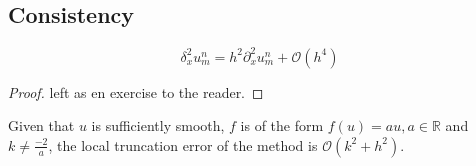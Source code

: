 \subsection{Consistency}

\begin{lemma}
    \label{central_difference}
    $$\delta_x^2u_{m}^{n} = h^2\partial_x^2 u_{m}^{n} + \mathcal{O}(h^4)$$
\end{lemma}
\begin{proof}
    left as en exercise to the reader.
\end{proof}

\begin{theorem}
    \label{consistent}
    Given that $u$ is sufficiently smooth,  $f$ is of the form $f(u)=au, a\in \mathbb{R}$ and $k \neq \frac{-2}{a}$, the local truncation error of the method is $\mathcal{O}(k^2 + h^2).$
\end{theorem}

